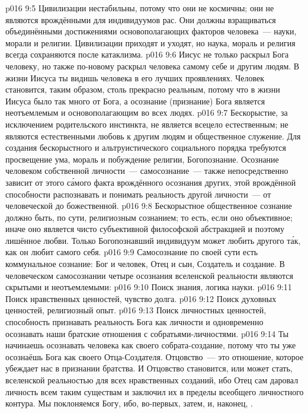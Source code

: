 \vs p016 9:5 Цивилизации нестабильны, потому что они не космичны; они не являются врождёнными для индивидуумов рас. Они должны взращиваться объединёнными достижениями основополагающих факторов человека~--- науки, морали и религии. Цивилизации приходят и уходят, но наука, мораль и религия всегда сохраняются после катаклизма.
\vs p016 9:6 Иисус не только раскрыл Бога человеку, но также по\hyp{}новому раскрыл человека самому себе и другим людям. В жизни Иисуса ты видишь человека в его лучших проявлениях. Человек становится, таким образом, столь прекрасно реальным, потому что в жизни Иисуса было так много от Бога, а осознание (признание) Бога является неотъемлемым и основополагающим во всех людях.
\vs p016 9:7 \pc Бескорыстие, за исключением родительского инстинкта, не является всецело естественным; не являются естественными любовь к другим людям и общественное служение. Для создания бескорыстного и альтруистического социального порядка требуются просвещение ума, мораль и побуждение религии, Богопознание. Осознание человеком собственной личности~--- самосознание~--- также непосредственно зависит от этого с\'амого факта врождённого осознания других, этой врождённой способности распознавать и понимать реальность другой личности~--- от человеческой до божественной.
\vs p016 9:8 Бескорыстное общественное сознание должно быть, по сути, религиозным сознанием; то есть, если оно объективное; иначе оно является чисто субъективной философской абстракцией и поэтому лишённое любви. Только Богопознавший индивидуум может любить другого т\'ак, как он любит самого себя.
\vs p016 9:9 Самосознание по своей сути есть коммунальное сознание: Бог и человек, Отец и сын, Создатель и создание. В человеческом самосознании четыре осознания вселенской реальности являются скрытыми и неотъемлемыми:
\vs p016 9:10 Поиск знания, логика науки.
\vs p016 9:11 Поиск нравственных ценностей, чувство долга.
\vs p016 9:12 Поиск духовных ценностей, религиозный опыт.
\vs p016 9:13 Поиск личностных ценностей, способность признавать реальность Бога как личности и одновременно осознавать наши братские отношения с собратьями\hyp{}личностями.
\vs p016 9:14 \pc Ты начинаешь осознавать человека как своего собрата\hyp{}создание, потому что ты уже осознаёшь Бога как своего Отца\hyp{}Создателя. Отцовство~--- это отношение, которое убеждает нас в признании братства. И Отцовство становится, или может стать, вселенской реальностью для всех нравственных созданий, ибо Отец сам даровал личность всем таким существам и заключил их в пределы всеобщего личностного контура. Мы поклоняемся Богу, ибо, во\hyp{}первых,  затем,  и, наконец, .
